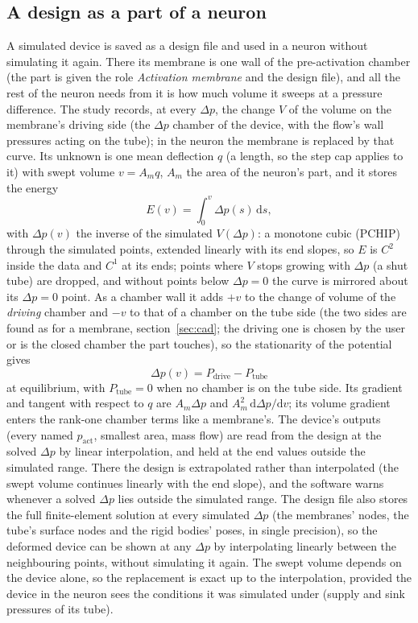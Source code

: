 \documentclass[11pt,a4paper]{article}
\theoremstyle{remark}
\begin{document}
\subsection{A design as a part of a neuron}\label{sec:empirical}
A simulated device is saved as a design file and used in a neuron without simulating it again. There
its membrane is one wall of the pre-activation chamber (the part is given the role \emph{Activation
membrane} and the design file), and all the rest of the neuron needs from it is how much volume it
sweeps at a pressure difference. The study records, at every $\Delta p$, the change $V$ of the
volume on the membrane's driving side (the $\Delta p$ chamber of the device, with the flow's wall
pressures acting on the tube); in the neuron the membrane is replaced by that curve. Its unknown is
one mean deflection $q$ (a length, so the step cap applies to it) with swept volume $v = A_m q$, $A_m$
the area of the neuron's part, and it stores the energy
\begin{equation}\label{eq:empirical}
  E(v) = \int_0^{v} \Delta p(s)\,\mathrm{d}s ,
\end{equation}
with $\Delta p(v)$ the inverse of the simulated $V(\Delta p)$: a monotone cubic (PCHIP) through the
simulated points, extended linearly with its end slopes, so $E$ is $C^2$ inside the data and $C^1$
at its ends; points where $V$ stops growing with $\Delta p$ (a shut tube) are dropped, and without
points below $\Delta p = 0$ the curve is mirrored about its $\Delta p = 0$ point. As a chamber wall it
adds $+v$ to the change of volume of the \emph{driving} chamber and $-v$ to that of a chamber on the
tube side (the two sides are found as for a membrane, section~\ref{sec:cad}; the driving one is chosen
by the user or is the closed chamber the part touches), so the stationarity of the potential gives
\begin{equation}
  \Delta p(v) = P_\mathrm{drive} - P_\mathrm{tube}
\end{equation}
at equilibrium, with $P_\mathrm{tube} = 0$ when no chamber is on the tube side. Its gradient and
tangent with respect to $q$ are $A_m \Delta p$ and $A_m^2\,\mathrm{d}\Delta p/\mathrm{d}v$; its
volume gradient enters the rank-one chamber terms like a membrane's. The device's
outputs (every named $p_\mathrm{act}$, smallest area, mass flow) are read from the design at the solved $\Delta p$
by linear interpolation, and held at the end values outside the simulated range. There the design is
extrapolated rather than interpolated (the swept volume continues linearly with the end slope), and
the software warns whenever a solved $\Delta p$ lies outside the simulated range. The design file also
stores the full finite-element solution at every simulated $\Delta p$ (the membranes' nodes, the
tube's surface nodes and the rigid bodies' poses, in single precision), so the deformed device can be
shown at any $\Delta p$ by interpolating linearly between the neighbouring points, without simulating
it again.
The swept volume depends on the device alone, so the replacement is exact up to the
interpolation, provided the device in the neuron sees the conditions it was simulated under (supply
and sink pressures of its tube).
\end{document}
